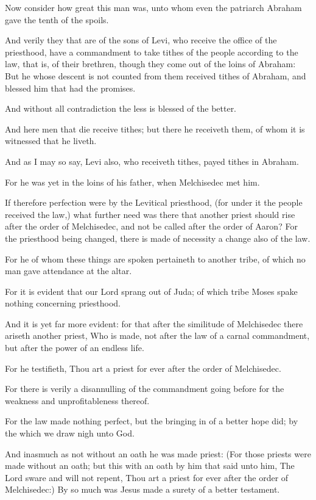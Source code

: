 \verse Now consider how great this man was, unto whom even the patriarch Abraham gave the tenth of the spoils.

\verse And verily they that are of the sons of Levi, who receive the office of the priesthood, have a commandment to take tithes of the people according to the law, that is, of their brethren, though they come out of the loins of Abraham: \verse But he whose descent is not counted from them received tithes of Abraham, and blessed him that had the promises.

\verse And without all contradiction the less is blessed of the better.

\verse And here men that die receive tithes; but there he receiveth them, of whom it is witnessed that he liveth.

\verse And as I may so say, Levi also, who receiveth tithes, payed tithes in Abraham.

\verse For he was yet in the loins of his father, when Melchisedec met him.

\verse If therefore perfection were by the Levitical priesthood, (for under it the people received the law,) what further need was there that another priest should rise after the order of Melchisedec, and not be called after the order of Aaron?  \verse For the priesthood being changed, there is made of necessity a change also of the law.

\verse For he of whom these things are spoken pertaineth to another tribe, of which no man gave attendance at the altar.

\verse For it is evident that our Lord sprang out of Juda; of which tribe Moses spake nothing concerning priesthood.

\verse And it is yet far more evident: for that after the similitude of Melchisedec there ariseth another priest, \verse Who is made, not after the law of a carnal commandment, but after the power of an endless life.

\verse For he testifieth, Thou art a priest for ever after the order of Melchisedec.

\verse For there is verily a disannulling of the commandment going before for the weakness and unprofitableness thereof.

\verse For the law made nothing perfect, but the bringing in of a better hope did; by the which we draw nigh unto God.

\verse And inasmuch as not without an oath he was made priest: \verse (For those priests were made without an oath; but this with an oath by him that said unto him, The Lord sware and will not repent, Thou art a priest for ever after the order of Melchisedec:) \verse By so much was Jesus made a surety of a better testament.

